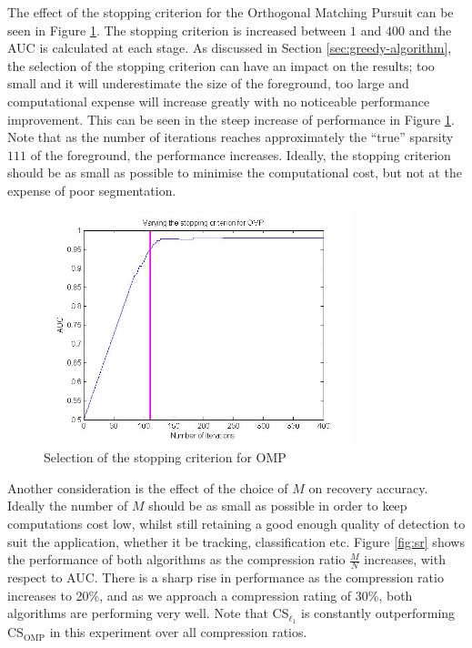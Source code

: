 \documentclass[conference]{IEEEtran}
\begin{document}
The effect of the stopping criterion for the Orthogonal Matching Pursuit can be seen in Figure \ref{fig:omp}. The stopping criterion is increased between $1$ and $400$ and the AUC is calculated at each stage. As discussed in Section \ref{sec:greedy-algorithm}, the selection of the stopping criterion can have an impact on the results; too small and it will underestimate the size of the foreground, too large and computational expense will increase greatly with no noticeable performance improvement. This can be seen in the steep increase of performance in Figure \ref{fig:omp}. Note that as the number of iterations reaches approximately the ``true'' sparsity $111$ of the foreground, the performance increases. Ideally, the stopping criterion should be as small as possible to minimise the computational cost, but not at the expense of poor segmentation. 

\begin{figure}[t]
  \centering
  \includegraphics[width = 9cm]{varyingSComp}
  \caption{Selection of the stopping criterion for OMP}
  \label{fig:omp}
\end{figure}

Another consideration is the effect of the choice of $M$ on recovery accuracy. Ideally the number of $M$ should be as small as possible in order to keep computations cost low, whilst still retaining a good enough quality of detection to suit the application, whether it be tracking, classification etc. Figure \ref{fig:sr} shows the performance of both algorithms as the compression ratio $\frac{M}{N}$ increases, with respect to AUC. There is a sharp rise in performance as the compression ratio increases to 20\%, and as we approach a compression rating of 30\%, both algorithms are performing very well. Note that CS$_{\ell_1}$ is constantly outperforming CS$_{\text{OMP}}$ in this experiment over all compression ratios.
\end{document}
